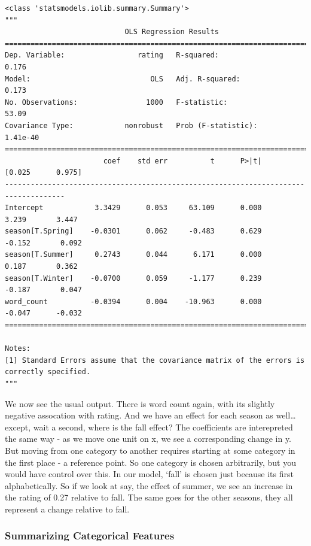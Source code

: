 \documentclass[
  letterpaper,
]{krantz}
\begin{document}
\begin{verbatim}
<class 'statsmodels.iolib.summary.Summary'>
"""
                            OLS Regression Results                            
==============================================================================
Dep. Variable:                 rating   R-squared:                       0.176
Model:                            OLS   Adj. R-squared:                  0.173
No. Observations:                1000   F-statistic:                     53.09
Covariance Type:            nonrobust   Prob (F-statistic):           1.41e-40
====================================================================================
                       coef    std err          t      P>|t|      [0.025      0.975]
------------------------------------------------------------------------------------
Intercept            3.3429      0.053     63.109      0.000       3.239       3.447
season[T.Spring]    -0.0301      0.062     -0.483      0.629      -0.152       0.092
season[T.Summer]     0.2743      0.044      6.171      0.000       0.187       0.362
season[T.Winter]    -0.0700      0.059     -1.177      0.239      -0.187       0.047
word_count          -0.0394      0.004    -10.963      0.000      -0.047      -0.032
====================================================================================

Notes:
[1] Standard Errors assume that the covariance matrix of the errors is correctly specified.
"""
\end{verbatim}

We now see the usual output. There is word count again, with its
slightly negative assocation with rating. And we have an effect for each
season as well\ldots{} except, wait a second, where is the fall effect?
The coefficients are interepreted the same way - as we move one unit on
x, we see a corresponding change in y. But moving from one category to
another requires starting at some category in the first place - a
reference point. So one category is chosen arbitrarily, but you would
have control over this. In our model, `fall' is chosen just because its
first alphabetically. So if we look at say, the effect of summer, we see
an increase in the rating of 0.27 relative to fall. The same goes for
the other seasons, they all represent a change relative to fall.

\subsubsection{Summarizing Categorical
Features}\label{summarizing-categorical-features}
\end{document}
